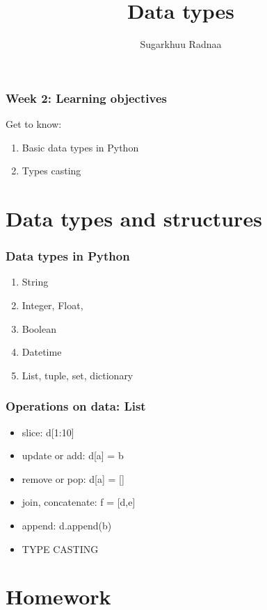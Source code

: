 \documentclass{beamer}
\title[Introduction to Python]{Data types}
\author{Sugarkhuu Radnaa}
\institute[]
{
Py4Econ in Ulaanbaatar \\ 
\medskip
\textit{py4econ@gmail.com} 
}
\date{}  %
\begin{document}
\begin{frame}
\titlepage %
\end{frame}

\begin{frame}
    \frametitle{Week 2: Learning objectives}
    Get to know: 
    \begin{enumerate}
        \item Basic data types in Python
        \item Types casting
    \end{enumerate}
\end{frame}

\section{Data types and structures} 

\begin{frame}
\frametitle{Data types in Python}
    \begin{enumerate}
        \item String
        \item Integer, Float, 
        \item Boolean
        \item Datetime
        \item List, tuple, set, dictionary
    \end{enumerate}
\end{frame}

\begin{frame}
    \frametitle{Operations on data: List}
        \begin{itemize}
            \item slice: d[1:10]
            \item update or add: d[a] = b
            \item remove or pop: d[a] = [] 
            \item join, concatenate: f = [d,e]
            \item append: d.append(b)
            \item TYPE CASTING
        \end{itemize}
\end{frame}

\section{Homework} 
\end{document}
